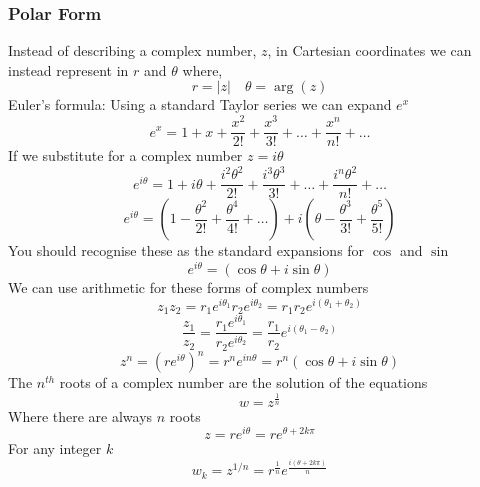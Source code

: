 \documentclass[11pt,titlepage]{article}
\numberwithin{equation}{subsection}
\begin{document}
\subsubsection{Polar Form}
Instead of describing a complex number, $z$, in Cartesian coordinates we can instead represent in $r$ and $\theta$ where,
\begin{equation}
    r=|z| \quad \theta=\arg(z)
\end{equation}
Euler's formula:
Using a standard Taylor series we can expand $e^x$
\begin{equation}
    e^x=1+x+\frac{x^2}{2!}+\frac{x^3}{3!}+\dots+\frac{x^n}{n!}+\dots
\end{equation}
If we substitute for a complex number $z=i\theta$
\begin{equation}
    e^{i\theta}=1+i\theta+\frac{i^2\theta^2}{2!}+\frac{i^3\theta^3}{3!}+\dots+\frac{i^n\theta^2}{n!}+\dots
\end{equation}
\begin{equation}
    e^{i\theta}=\left(1-\frac{\theta^2}{2!}+\frac{\theta^4}{4!}+\dots\right)+i\left(\theta-\frac{\theta^3}{3!}+\frac{\theta^5}{5!}\right)
\end{equation}
You should recognise these as the standard expansions for $\cos$ and $\sin$
\begin{equation}
    e^{i\theta}=(\cos \theta+i\sin \theta)
\end{equation}
We can use arithmetic for these forms of complex numbers
\begin{equation}
    z_{1}z_{2}=r_{1}e^{i\theta_{1}}r_{2}e^{i\theta_{2}}=r_{1}r_{2}e^{i(\theta_{1}+\theta_{2})}
\end{equation}
\begin{equation}
    \frac{z_{1}}{z_{2}}=\frac{r_{1}e^{i\theta_{1}}}{r_{2}e^{i\theta_{2}}}=\frac{r_{1}}{r_{2}}e^{i(\theta_{1}-\theta_{2})}
\end{equation}
\begin{equation}
    z^n=(re^{i\theta})^n=r^ne^{in\theta}=r^n(\cos \theta +i\sin \theta)
\end{equation}
The $n^{th}$ roots of a complex number are the solution of the equations 
\begin{equation}
    w=z^{\frac{1}{n}}
\end{equation}
Where there are always $n$ roots
\begin{equation}
    z=re^{i \theta}=re^{\theta+2k\pi} 
\end{equation}
For any integer $k$
\begin{equation}
    w_{k}=z^{1/n}=r^{\frac{1}{n}}e^{\frac{i(\theta+2k\pi)}{n}}
\end{equation}
\end{document}
